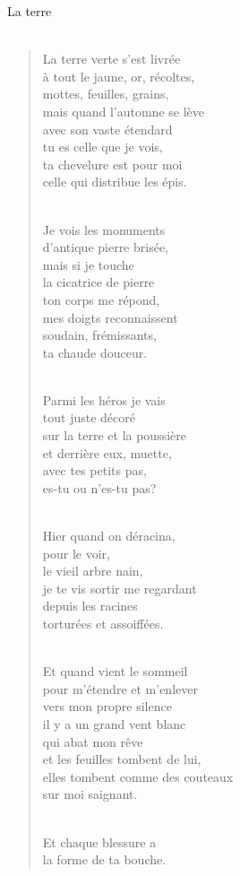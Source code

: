 \documentclass[11pt,a4paper]{book}
\begin{document}
\newpage

{\huge La terre} \\ \\

\begin{verse}
La terre verte s'est livrée \\
à tout le jaune, or, récoltes, \\
mottes, feuilles, grains, \\
mais quand l'automne se lève \\
avec son vaste étendard \\
tu es celle que je vois, \\
ta chevelure est pour moi \\
celle qui distribue les épis. \\ \

Je vois les monuments \\
d'antique pierre brisée, \\
mais si je touche \\
la cicatrice de pierre \\
ton corps me répond, \\
mes doigts reconnaissent \\
soudain, frémissants, \\
ta chaude douceur. \\ \

Parmi les héros je vais \\
tout juste décoré \\
sur la terre et la poussière \\
et derrière eux, muette, \\
avec tes petits pas, \\
es-tu ou n'es-tu pas? \\ \

Hier quand on déracina, \\
pour le voir, \\
le vieil arbre nain, \\
je te vis sortir me regardant \\
depuis les racines \\
torturées et assoiffées. \\ \

Et quand vient le sommeil \\
pour m'étendre et m'enlever \\
vers mon propre silence \\
il y a un grand vent blanc \\
qui abat mon rêve \\
et les feuilles tombent de lui, \\
elles tombent comme des couteaux \\
sur moi saignant. \\ \

Et chaque blessure a \\
la forme de ta bouche.
\end{verse}
\end{document}

